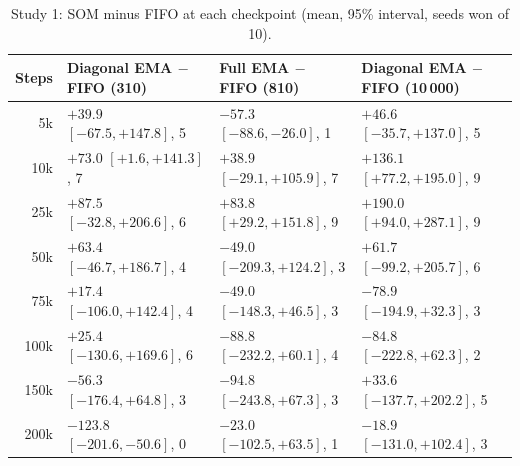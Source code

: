 \documentclass{article}
\begin{document}
\begin{table}[h]
\caption{Study 1: SOM minus FIFO at each checkpoint (mean, 95\% interval,
seeds won of 10).}
\label{tab:gap}
\centering
\small
\begin{tabular}{rlll}
\toprule
Steps & Diagonal EMA $-$ FIFO (310) & Full EMA $-$ FIFO (810) & Diagonal EMA $-$ FIFO (10\,000) \\
\midrule
5k & $+39.9$ $[-67.5, +147.8]$, 5 & $-57.3$ $[-88.6, -26.0]$, 1 & $+46.6$ $[-35.7, +137.0]$, 5 \\
10k & $+73.0$ $[+1.6, +141.3]$, 7 & $+38.9$ $[-29.1, +105.9]$, 7 & $+136.1$ $[+77.2, +195.0]$, 9 \\
25k & $+87.5$ $[-32.8, +206.6]$, 6 & $+83.8$ $[+29.2, +151.8]$, 9 & $+190.0$ $[+94.0, +287.1]$, 9 \\
50k & $+63.4$ $[-46.7, +186.7]$, 4 & $-49.0$ $[-209.3, +124.2]$, 3 & $+61.7$ $[-99.2, +205.7]$, 6 \\
75k & $+17.4$ $[-106.0, +142.4]$, 4 & $-49.0$ $[-148.3, +46.5]$, 3 & $-78.9$ $[-194.9, +32.3]$, 3 \\
100k & $+25.4$ $[-130.6, +169.6]$, 6 & $-88.8$ $[-232.2, +60.1]$, 4 & $-84.8$ $[-222.8, +62.3]$, 2 \\
150k & $-56.3$ $[-176.4, +64.8]$, 3 & $-94.8$ $[-243.8, +67.3]$, 3 & $+33.6$ $[-137.7, +202.2]$, 5 \\
200k & $-123.8$ $[-201.6, -50.6]$, 0 & $-23.0$ $[-102.5, +63.5]$, 1 & $-18.9$ $[-131.0, +102.4]$, 3 \\
\bottomrule
\end{tabular}
\end{table}
\end{document}
